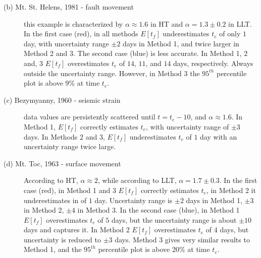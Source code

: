 \documentclass{article}
\begin{document}
\begin{description}
  \item[(b) Mt. St. Helens, 1981 - fault movement] this example is characterized by $\alpha \approx 1.6$ in HT and $\alpha = 1.3\pm 0.2$ in LLT. In the first case (red), in all methods $E[t_f]$ underestimates $t_e$ of only $1$ day, with uncertainty range $\pm 2$ days in Method 1, and twice larger in Method 2 and 3. The second case (blue) is less accurate. In Method 1, 2 and, 3 $E[t_f]$ overestimates $t_e$ of $14$, $11$, and $14$ days, respectively. Always outside the uncertainty range. However, in Method 3 the $95^{th}$ percentile plot is above 9\% at time $t_e$.
  \item[(c) Bezymyanny, 1960 - seismic strain] data values are persistently scattered until $t = t_e - 10$, and $\alpha \approx 1.6$. In Method 1, $E[t_f]$ correctly estimates $t_e$, with uncertainty range of $\pm 3$ days. In Methods 2 and 3, $E[t_f]$ underestimates $t_e$ of $1$ day with an uncertainty range twice large.
  \item[(d) Mt. Toc, 1963 - surface movement] According to HT, $\alpha \approx 2$, while according to LLT, $\alpha= 1.7\pm0.3$. In the first case (red), in Method 1 and 3 $E[t_f]$ correctly estimates $t_e$, in Method 2 it underestimates in of $1$ day. Uncertainty range is $\pm 2$ days in Method 1, $\pm 3$ in Method 2, $\pm 4$ in Method 3. In the second case (blue), in Method 1 $E[t_f]$ overestimates $t_e$ of $5$ days, but the uncertainty range is about $\pm 10$ days and captures it. In Method 2 $E[t_f]$ overestimates $t_e$ of $4$ days, but uncertainty is reduced to $\pm 3$ days. Method 3 gives very similar results to Method 1, and the $95^{th}$ percentile plot is above 20\% at time $t_e$.
\end{description}
\end{document}
